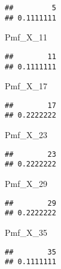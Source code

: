 \documentclass[
]{article}
\newenvironment{Shaded}{\begin{snugshade}}{\end{snugshade}}
\newcommand{\NormalTok}[1]{#1}
\begin{document}
\begin{verbatim}
##         5 
## 0.1111111
\end{verbatim}

\begin{Shaded}
\begin{Highlighting}[]
\NormalTok{Pmf\_X\_11}
\end{Highlighting}
\end{Shaded}

\begin{verbatim}
##        11 
## 0.1111111
\end{verbatim}

\begin{Shaded}
\begin{Highlighting}[]
\NormalTok{Pmf\_X\_17}
\end{Highlighting}
\end{Shaded}

\begin{verbatim}
##        17 
## 0.2222222
\end{verbatim}

\begin{Shaded}
\begin{Highlighting}[]
\NormalTok{Pmf\_X\_23}
\end{Highlighting}
\end{Shaded}

\begin{verbatim}
##        23 
## 0.2222222
\end{verbatim}

\begin{Shaded}
\begin{Highlighting}[]
\NormalTok{Pmf\_X\_29}
\end{Highlighting}
\end{Shaded}

\begin{verbatim}
##        29 
## 0.2222222
\end{verbatim}

\begin{Shaded}
\begin{Highlighting}[]
\NormalTok{Pmf\_X\_35}
\end{Highlighting}
\end{Shaded}

\begin{verbatim}
##        35 
## 0.1111111
\end{verbatim}
\end{document}
